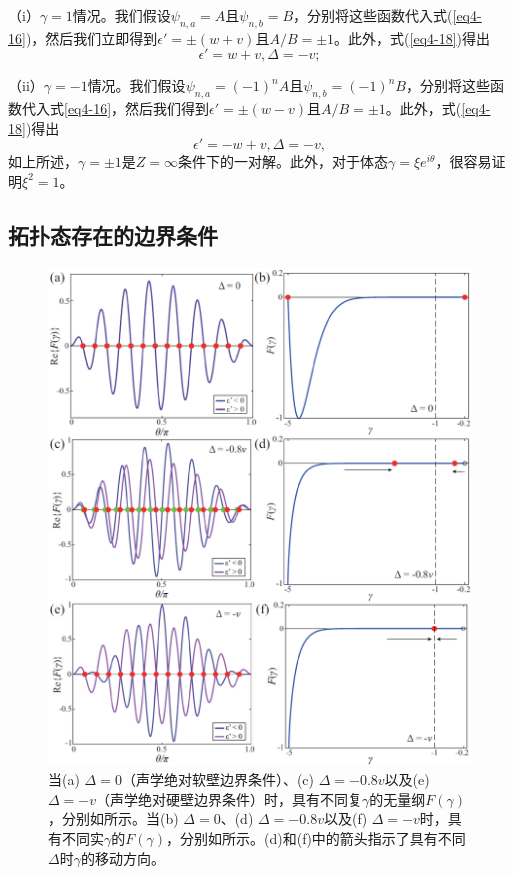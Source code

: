 （i）\(\gamma = 1\)情况。我们假设\(\psi_{n,a}=A\)且\(\psi_{n,b}=B\)，分别将这些函数代入式(\ref{eq4-16})，然后我们立即得到\(\epsilon'=\pm(w + v)\)且\(A/B=\pm1\)。此外，式(\ref{eq4-18})得出
\begin{equation}\label{eq4-31}
    \epsilon' = w + v, \Delta = -v;
\end{equation}

（ii）\(\gamma = -1\)情况。我们假设\(\psi_{n,a}=(-1)^{n}A\)且\(\psi_{n,b}=(-1)^{n}B\)，分别将这些函数代入式\ref{eq4-16}，然后我们得到\(\epsilon'=\pm(w - v)\)且\(A/B=\pm1\)。此外，式(\ref{eq4-18})得出
\begin{equation}\label{eq4-32}
    \epsilon' = -w + v, \Delta = -v,
\end{equation}
如上所述，\(\gamma=\pm1\)是\(Z=\infty\)条件下的一对解。此外，对于体态\(\gamma=\xi e^{i\theta}\)，很容易证明\(\xi^{2}=1\)。

\subsection{拓扑态存在的边界条件}

\begin{figure}[h!]
    \centering
    \includegraphics[width=1\textwidth]{images/fig4-4.eps} 
    \caption{当(a) $\Delta = 0$（声学绝对软壁边界条件）、(c) $\Delta = -0.8v$以及(e) $\Delta = -v$（声学绝对硬壁边界条件）时，具有不同复$\gamma$的无量纲$F(\gamma)$，分别如所示。当(b) $\Delta = 0$、(d) $\Delta = -0.8v$以及(f) $\Delta = -v$时，具有不同实$\gamma$的$F(\gamma)$，分别如所示。(d)和(f)中的箭头指示了具有不同$\Delta$时$\gamma$的移动方向。}
    \label{fig_4_4}
\end{figure} 

